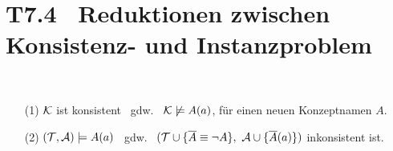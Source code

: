 \documentclass[fontsize=11pt, twoside=false, numbers=autoenddot]{scrbook}
\begin{document}
\enlargethispage{10mm}
\section*{T7.4~ Reduktionen zwischen Konsistenz- und Instanzproblem}

~
%
\begin{enumerate}
  \item[(1)]
    $\mathcal{K}$ ist konsistent ~gdw.~ $\mathcal{K} \not\models A(a)$, für einen neuen Konzeptnamen $A$.
  \item[(2)]
    $(\mathcal{T},\mathcal{A}) \models A(a)$ ~gdw.~ $(\mathcal{T} \cup \{ \overline{A} \equiv \neg A \},~\mathcal{A} \cup \{ \overline{A}(a) \})$ inkonsistent ist.
\end{enumerate}
\end{document}

